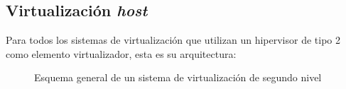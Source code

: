 \subsection{Virtualización \emph{host}}
Para todos los sistemas de virtualización que utilizan un hipervisor de tipo 2 como elemento virtualizador, esta es su arquitectura:

\begin{figure}[H]
\begin{center}
\end{center}
\caption[Virtualización \emph{host}]{Esquema general de un sistema de virtualización de segundo nivel}
\end{figure}